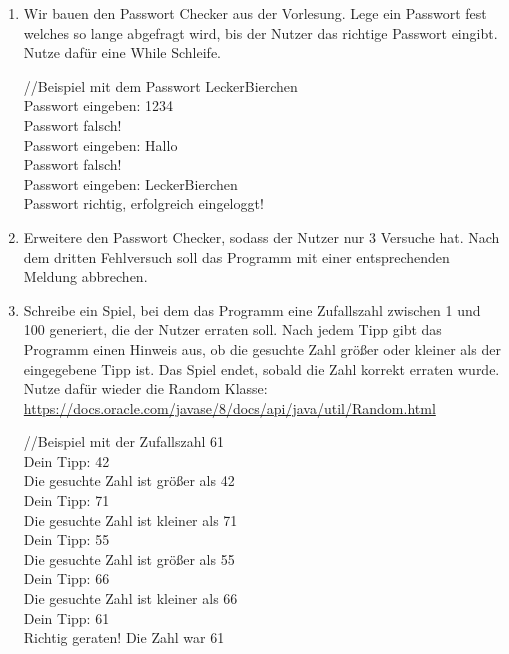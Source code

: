 \documentclass{../../sheet}
\begin{document}
\newpage

\begin{enumerate}
    \item Wir bauen den Passwort Checker aus der Vorlesung. Lege ein Passwort fest welches so lange abgefragt wird, bis der Nutzer das richtige Passwort eingibt. Nutze dafür eine While Schleife.
    \begin{ausgabe}
        //Beispiel mit dem Passwort LeckerBierchen\\
        Passwort eingeben: 1234\\
        Passwort falsch!\\
        Passwort eingeben: Hallo\\
        Passwort falsch!\\
        Passwort eingeben: LeckerBierchen\\
        Passwort richtig, erfolgreich eingeloggt!
    \end{ausgabe}
    \item Erweitere den Passwort Checker, sodass der Nutzer nur 3 Versuche hat. Nach dem dritten Fehlversuch soll das Programm mit einer entsprechenden Meldung abbrechen.

    \item Schreibe ein Spiel, bei dem das Programm eine Zufallszahl zwischen 1 und 100 generiert, die der Nutzer erraten soll. Nach jedem Tipp gibt das Programm einen Hinweis aus, ob die gesuchte Zahl größer oder kleiner als der eingegebene Tipp ist. Das Spiel endet, sobald die Zahl korrekt erraten wurde. Nutze dafür wieder die Random Klasse: \url{https://docs.oracle.com/javase/8/docs/api/java/util/Random.html}
        \begin{ausgabe}
            //Beispiel mit der Zufallszahl 61\\
            Dein Tipp: 42\\
            Die gesuchte Zahl ist größer als 42\\
            Dein Tipp: 71\\
            Die gesuchte Zahl ist kleiner als 71\\
            Dein Tipp: 55\\
            Die gesuchte Zahl ist größer als 55\\
            Dein Tipp: 66\\
            Die gesuchte Zahl ist kleiner als 66\\
            Dein Tipp: 61\\
            Richtig geraten! Die Zahl war 61
        \end{ausgabe}
\end{enumerate}
\end{document}
